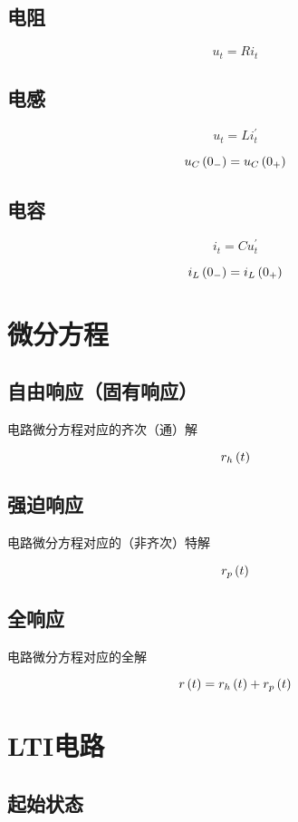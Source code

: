 \documentclass{article}
\begin{document}
\subsection{电阻}

\[u_t=Ri_t\]

\subsection{电感}

\[u_t=Li_t^\prime\]

\[u_C\left(0_-\right)=u_C\left(0_+\right)\]

\subsection{电容}

\[i_t=Cu_t^\prime\]

\[i_L\left(0_-\right)=i_L\left(0_+\right)\]

\section{微分方程}

\subsection{自由响应（固有响应）}

电路微分方程对应的齐次（通）解

\[r_h\left(t\right)\]

\subsection{强迫响应}

电路微分方程对应的（非齐次）特解

\[r_p\left(t\right)\]

\subsection{全响应}

电路微分方程对应的全解

\[r\left(t\right)=r_h\left(t\right)+r_p\left(t\right)\]

\section{LTI电路}

\subsection{起始状态}
\end{document}
